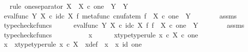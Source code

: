 \begin{isabellebody}
\ \ \isamarkupfalse%
{\isacharparenleft}{\kern0pt}rule\ one{\isacharunderscore}{\kern0pt}separator{\isacharbrackleft}{\kern0pt}\ X\ {\isacharequal}{\kern0pt}\ {\isachardoublequoteopen}X\ {\isasymtimes}\isactrlsub c\ one{\isachardoublequoteclose}{\isacharcomma}{\kern0pt}\ \ Y\ {\isacharequal}{\kern0pt}\ Y{\isacharbrackright}{\kern0pt}{\isacharparenright}{\kern0pt}\isanewline
\ \ \ \ \isamarkupfalse%
\ {\isachardoublequoteopen}eval{\isacharunderscore}{\kern0pt}func\ Y\ X\ {\isasymcirc}\isactrlsub c\ id\isactrlsub c\ X\ {\isasymtimes}\isactrlsub f\ {\isacharparenleft}{\kern0pt}metafunc\ {\isacharparenleft}{\kern0pt}cnufatem\ f{\isacharparenright}{\kern0pt}{\isacharparenright}{\kern0pt}\ {\isacharcolon}{\kern0pt}\ X\ {\isasymtimes}\isactrlsub c\ one\ {\isasymrightarrow}\ Y{\isachardoublequoteclose}\isanewline
\ \ \ \ \ \ \isamarkupfalse%
\ assms\ \isamarkupfalse%
\ {\isacharparenleft}{\kern0pt}typecheck{\isacharunderscore}{\kern0pt}cfuncs{\isacharparenright}{\kern0pt}\isanewline
\ \ \ \ \isamarkupfalse%
\ {\isachardoublequoteopen}eval{\isacharunderscore}{\kern0pt}func\ Y\ X\ {\isasymcirc}\isactrlsub c\ id\isactrlsub c\ X\ {\isasymtimes}\isactrlsub f\ f\ {\isacharcolon}{\kern0pt}\ X\ {\isasymtimes}\isactrlsub c\ one\ {\isasymrightarrow}\ Y{\isachardoublequoteclose}\isanewline
\ \ \ \ \ \ \isamarkupfalse%
\ assms\ \isamarkupfalse%
\ typecheck{\isacharunderscore}{\kern0pt}cfuncs\isanewline
\ \ \isamarkupfalse%
\ \isanewline
\ \ \ \ \isamarkupfalse%
\ x{}\isanewline
\ \ \ \ \isamarkupfalse%
\ x{}{\isacharunderscore}{\kern0pt}type{\isacharbrackleft}{\kern0pt}type{\isacharunderscore}{\kern0pt}rule{\isacharbrackright}{\kern0pt}{\isacharcolon}{\kern0pt}\ {\isachardoublequoteopen}x{}\ {\isasymin}\isactrlsub c\ X\ {\isasymtimes}\isactrlsub c\ one{\isachardoublequoteclose}\isanewline
\ \ \ \ \isamarkupfalse%
\ \isamarkupfalse%
\ x\ \ x{\isacharunderscore}{\kern0pt}type{\isacharbrackleft}{\kern0pt}type{\isacharunderscore}{\kern0pt}rule{\isacharbrackright}{\kern0pt}{\isacharcolon}{\kern0pt}\ {\isachardoublequoteopen}x\ {\isasymin}\isactrlsub c\ X{\isachardoublequoteclose}\ \ x{\isacharunderscore}{\kern0pt}def{\isacharcolon}{\kern0pt}\ {\isachardoublequoteopen}\ x{}\ {\isacharequal}{\kern0pt}\ {\isasymlangle}x{\isacharcomma}{\kern0pt}\ id\ one{\isasymrangle}{\isachardoublequoteclose}\isanewline

\end{isabellebody}
